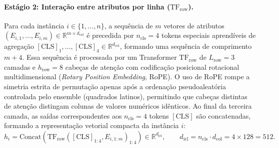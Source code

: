 \documentclass[11pt,a4paper]{article}
\begin{document}
\paragraph{Estágio 2: Interação entre atributos por linha ($\mathrm{TF}_{\mathrm{row}}$).}
Para cada instância $i \in \{1, \dots, n\}$, a sequência de $m$ vetores de atributos $(E_{i,1}, \dots, E_{i,m}) \in \mathbb{R}^{m \times d_{\mathrm{col}}}$ é precedida por $n_{\mathrm{cls}} = 4$ tokens especiais aprendíveis de agregação $[\mathrm{CLS}]_1, \dots, [\mathrm{CLS}]_4 \in \mathbb{R}^{d_{\mathrm{col}}}$, formando uma sequência de comprimento $m + 4$. Essa sequência é processada por um Transformer $\mathrm{TF}_{\mathrm{row}}$ de $L_{\mathrm{row}} = 3$ camadas e $h_{\mathrm{row}} = 8$ cabeças de atenção com codificação posicional rotacional multidimensional (\emph{Rotary Position Embedding}, RoPE). O uso de RoPE rompe a simetria estrita de permutação apenas após a ordenação pseudoaleatória controlada pelo ensemble (quadrados latinos), permitindo que cabeças distintas de atenção distingam colunas de valores numéricos idênticos. Ao final da terceira camada, as saídas correspondentes aos $n_{\mathrm{cls}} = 4$ tokens $[\mathrm{CLS}]$ são concatenadas, formando a representação vetorial compacta da instância $i$:
\begin{equation}
    h_i = \mathrm{Concat}\!\left(\mathrm{TF}_{\mathrm{row}}([\mathrm{CLS}]_{1:4}, E_{i,1:m})_{1:4}\right) \in \mathbb{R}^{d_{\mathrm{icl}}}, \qquad d_{\mathrm{icl}} = n_{\mathrm{cls}} \cdot d_{\mathrm{col}} = 4 \times 128 = 512.
    \label{eq:tf_row}
\end{equation}
\end{document}
